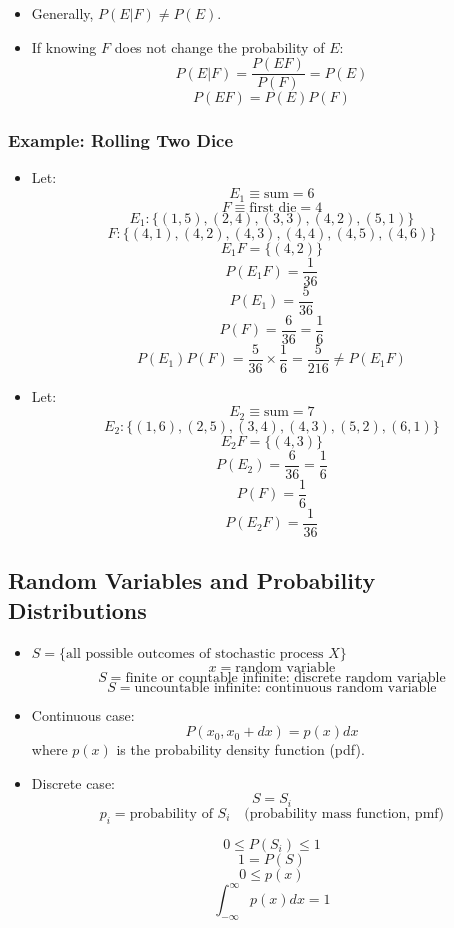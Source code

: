 \begin{itemize}
    \item Generally, $P(E|F) \neq P(E)$.
    \item If knowing $F$ does not change the probability of $E$:
          \[ P(E|F) = \frac{P(EF)}{P(F)} = P(E) \]
          \[ \boxed{P(EF) = P(E)P(F)} \]
\end{itemize}

\subsubsection{Example: Rolling Two Dice}

\begin{itemize}
    \item Let:
          \[ E_1 \equiv \text{sum} = 6 \]
          \[ F \equiv \text{first die} = 4 \]
          \[ E_1: \{(1,5), (2,4), (3,3), (4,2), (5,1)\} \]
          \[ F: \{(4,1), (4,2), (4,3), (4,4), (4,5), (4,6)\} \]
          \[ E_1 F = \{(4,2)\} \]
          \[ P(E_1 F) = \frac{1}{36} \]
          \[ P(E_1) = \frac{5}{36} \]
          \[ P(F) = \frac{6}{36}  = \frac{1}{6} \]
          \[ P(E_1) P(F) = \frac{5}{36} \times \frac{1}{6} = \frac{5}{216} \neq P(E_1 F) \]

    \item Let:
          \[ E_2 \equiv \text{sum} = 7 \]
          \[ E_2: \{(1,6), (2,5), (3,4), (4,3), (5,2), (6,1)\} \]
          \[ E_2 F = \{(4,3)\} \]
          \[ P(E_2) = \frac{6}{36} = \frac{1}{6} \]
          \[ P(F) = \frac{1}{6} \]
          \[ P(E_2 F) = \frac{1}{36} \]
\end{itemize}

\subsection{Random Variables and Probability Distributions}

\begin{itemize}
    \item $S = \{ \text{all possible outcomes of stochastic process } X \}$
          \[ x = \text{random variable} \]
          \[ S = \text{finite or countable infinite: discrete random variable} \]
          \[ S = \text{uncountable infinite: continuous random variable} \]

    \item Continuous case:
          \[ P(x_0, x_0 + dx) = p(x) dx \]
          where $p(x)$ is the probability density function (pdf).

    \item Discrete case:
          \[ S = S_i \]
          \[ p_i = \text{probability of } S_i \quad \text{(probability mass function, pmf)} \]

          \[ 0 \leq P(S_i) \leq 1 \]
          \[ 1 = P(S) \]
          \[ 0 \leq p(x) \]
          \[ \int_{-\infty}^{\infty} p(x) dx = 1 \]
\end{itemize}


